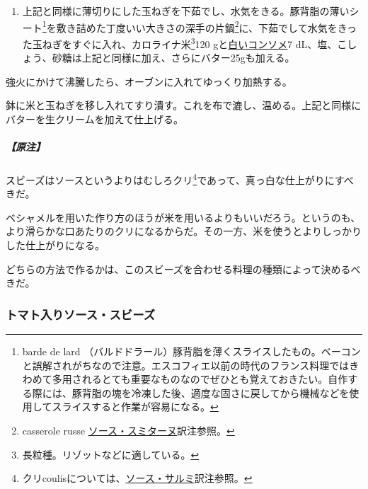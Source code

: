 \begin{recette}
\begin{enumerate}
\def\labelenumi{\arabic{enumi}.}
\setcounter{enumi}{1}
\tightlist
\item
  上記と同様に薄切りにした玉ねぎを下茹でし、水気をきる。豚背脂の薄いシート\footnote{barde
    de lard
    （バルドドラール）豚背脂を薄くスライスしたもの。ベーコンと誤解されがちなので注意。エスコフィエ以前の時代のフランス料理ではきわめて多用されるとても重要なものなのでぜひとも覚えておきたい。自作する際には、豚背脂の塊を冷凍した後、適度な固さに戻してから機械などを使用してスライスすると作業が容易になる。}を敷き詰めた丁度いい大きさの深手の片鍋\footnote{casserole
    russe
    \protect\hyperlink{sauce-smitane}{ソース・スミターヌ}訳注参照。}に、下茹でして水気をきった玉ねぎをすぐに入れ、カロライナ米\footnote{長粒種。リゾットなどに適している。}120
  gと\protect\hyperlink{consomme-blanc}{白いコンソメ}7
  dL、塩、こしょう、砂糖は上記と同様に加え、さらにバター25gも加える。
\end{enumerate}

強火にかけて沸騰したら、オーブンに入れてゆっくり加熱する。

鉢に米と玉ねぎを移し入れてすり潰す。これを布で漉し、温める。上記と同様にバターを生クリームを加えて仕上げる。

\hypertarget{nota-sauce-soubise}{%
\subparagraph{【原注】}\label{nota-sauce-soubise}}

スビーズはソースというよりはむしろクリ\footnote{クリcoulisについては、\protect\hyperlink{sauce-salmis}{ソース・サルミ}訳注参照。}であって、真っ白な仕上がりにすべきだ。

ベシャメルを用いた作り方のほうが米を用いるよりもいいだろう。というのも、より滑らかな口あたりのクリになるからだ。その一方、米を使うとよりしっかりした仕上がりになる。

どちらの方法で作るかは、このスビーズを合わせる料理の種類によって決めるべきだ。

\atoaki{}

\hypertarget{sauce-soubise-tomatee}{%
\subsubsection{トマト入りソース・スビーズ}\label{sauce-soubise-tomatee}}




\end{recette}
